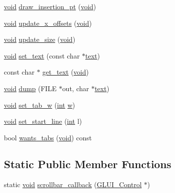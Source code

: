 \begin{DoxyCompactItemize}
\item 
\hyperlink{wglext_8h_a9e6b7f1933461ef318bb000d6bd13b83}{void} \hyperlink{class_g_l_u_i___text_box_a0aa5e4a15073336f90df775f9820c276}{draw\+\_\+insertion\+\_\+pt} (\hyperlink{wglext_8h_a9e6b7f1933461ef318bb000d6bd13b83}{void})
\item 
\hyperlink{wglext_8h_a9e6b7f1933461ef318bb000d6bd13b83}{void} \hyperlink{class_g_l_u_i___text_box_a77a14ce650cc1f043b7e5047a69081a6}{update\+\_\+x\+\_\+offsets} (\hyperlink{wglext_8h_a9e6b7f1933461ef318bb000d6bd13b83}{void})
\item 
\hyperlink{wglext_8h_a9e6b7f1933461ef318bb000d6bd13b83}{void} \hyperlink{class_g_l_u_i___text_box_a36ae0f7f0beb253ca09cd1d3f141f6b9}{update\+\_\+size} (\hyperlink{wglext_8h_a9e6b7f1933461ef318bb000d6bd13b83}{void})
\item 
\hyperlink{wglext_8h_a9e6b7f1933461ef318bb000d6bd13b83}{void} \hyperlink{class_g_l_u_i___text_box_a99733f4d591d54f26237f7c8023411b0}{set\+\_\+text} (const char $\ast$\hyperlink{class_g_l_u_i___control_af0d60e9736f4dbc34e9a536e75876d72}{text})
\item 
const char $\ast$ \hyperlink{class_g_l_u_i___text_box_a052758e34ba64b19325c4e9be1cfcbb0}{get\+\_\+text} (\hyperlink{wglext_8h_a9e6b7f1933461ef318bb000d6bd13b83}{void})
\item 
\hyperlink{wglext_8h_a9e6b7f1933461ef318bb000d6bd13b83}{void} \hyperlink{class_g_l_u_i___text_box_ab137704b05cf5549def1713599b89552}{dump} (F\+I\+L\+E $\ast$out, char $\ast$\hyperlink{class_g_l_u_i___control_af0d60e9736f4dbc34e9a536e75876d72}{text})
\item 
\hyperlink{wglext_8h_a9e6b7f1933461ef318bb000d6bd13b83}{void} \hyperlink{class_g_l_u_i___text_box_a6d461630cec6d9a388ad92f31fc052b1}{set\+\_\+tab\+\_\+w} (\hyperlink{wglext_8h_a500a82aecba06f4550f6849b8099ca21}{int} \hyperlink{glext_8h_a713abae75276598501f75c68917c5e2d}{w})
\item 
\hyperlink{wglext_8h_a9e6b7f1933461ef318bb000d6bd13b83}{void} \hyperlink{class_g_l_u_i___text_box_a36e8f773e0bcd48aebc103e3d9b24903}{set\+\_\+start\+\_\+line} (\hyperlink{wglext_8h_a500a82aecba06f4550f6849b8099ca21}{int} l)
\item 
bool \hyperlink{class_g_l_u_i___text_box_adb058a900dfbf996ad9c24db82ab66c3}{wants\+\_\+tabs} (\hyperlink{wglext_8h_a9e6b7f1933461ef318bb000d6bd13b83}{void}) const 
\end{DoxyCompactItemize}
\subsection*{Static Public Member Functions}
\begin{DoxyCompactItemize}
\item 
static \hyperlink{wglext_8h_a9e6b7f1933461ef318bb000d6bd13b83}{void} \hyperlink{class_g_l_u_i___text_box_aee80715231779a7911c1d547f3c4146a}{scrollbar\+\_\+callback} (\hyperlink{class_g_l_u_i___control}{G\+L\+U\+I\+\_\+\+Control} $\ast$)
\end{DoxyCompactItemize}
